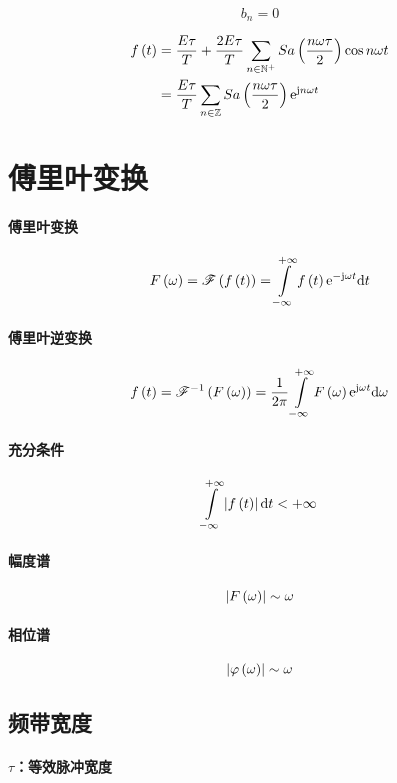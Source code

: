 \documentclass{article}
\begin{document}
\[b_n=0\]

\[\begin{aligned}
        f\left(t\right) & =\frac{E\tau}T+\frac{2E\tau}T\sum_{n\in\mathbb N^+}Sa\left(\frac{n\omega\tau}2\right)\cos n\omega t \\
            & =\frac{E\tau}T\sum_{n\in\mathbb Z} Sa\left(\frac{n\omega\tau}2\right)\mathrm e^{\mathrm j n\omega t}
    \end{aligned}\]

\section{傅里叶变换}

\paragraph{傅里叶变换}

\[\fw=\fourier\ft=\impint\ft\e^{-\j\omega t}\d t\]

\paragraph{傅里叶逆变换}

\[\ft=\ifourier{\fw}=\frac1{2\pi}\impint \fw\e^{\j\omega t}\d\omega\]

\paragraph{充分条件}

\[\impint\abs\ft\d t<+\infty\]

\paragraph{幅度谱}

\[\left|F\left(\omega\right)\right|\sim \omega\]

\paragraph{相位谱}

\[\left|\varphi\left(\omega\right)\right|\sim \omega\]

\subsection{频带宽度}

\paragraph{$\tau$：等效脉冲宽度}
\end{document}
